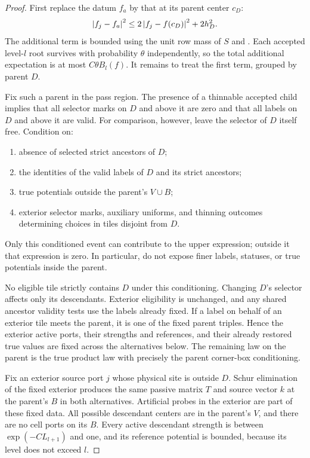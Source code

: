 \begin{proof}
First replace the datum $f_a$ by that at its parent center $c_D$:
\[
 \left\lvert f_j-f_a\right\rvert^2
       \le2\left\lvert f_j-f(c_D)\right\rvert^2+2h_D^2.
\]
The additional term is bounded using the unit row mass of $S$ and
.  Each accepted level-$l$ root survives with
probability $\theta$ independently, so the total additional expectation
is at most $C\theta B_l(f)$.  It remains to treat the first term, grouped
by parent $D$.

Fix such a parent in the pass region.  The presence of a thinnable
accepted child implies that all selector marks on $D$ and above it are
zero and that all labels on $D$ and above it are valid.  For comparison,
however, leave the selector of $D$ itself free.  Condition on:
\begin{enumerate}[label=(\roman*),leftmargin=*]
 \item absence of selected strict ancestors of $D$;
 \item the identities of the valid labels of $D$ and its strict
       ancestors;
 \item true potentials outside the parent's $V\cup B$;
 \item exterior selector marks, auxiliary uniforms, and thinning
       outcomes determining choices in tiles disjoint from $D$.
\end{enumerate}
Only this conditioned event can contribute to the upper expression;
outside it that expression is zero.  In particular, do not expose finer
labels, statuses, or true potentials inside the parent.

No eligible tile strictly contains $D$ under this conditioning.
Changing $D$'s selector affects only its descendants.  Exterior
eligibility is unchanged, and any shared ancestor validity tests use
the labels already fixed.  If a label on behalf of an exterior tile
meets the parent, it is one of the fixed parent triples.  Hence the
exterior active ports, their strengths and references, and their
already restored true values are fixed across the alternatives below.
The remaining law on the parent is the true product law with precisely
the parent corner-box conditioning.

Fix an exterior source port $j$ whose physical site is outside $D$.
Schur elimination of the fixed exterior produces the same passive
matrix $T$ and source vector $k$ at the parent's $B$ in both
alternatives.  Artificial probes in the exterior are part of these
fixed data.  All possible descendant centers are in the parent's $V$,
and there are no cell ports on its $B$.  Every active descendant
strength is between $\exp(-C L_{l+1})$ and one, and its reference
potential is bounded, because its level does not exceed $l$.


\end{proof}
